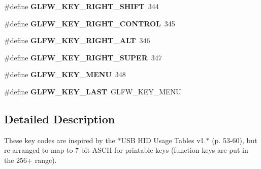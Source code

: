 \begin{DoxyCompactItemize}
\item 
\hypertarget{group__keys_gaffca36b99c9dce1a19cb9befbadce691}{\#define {\bfseries \-G\-L\-F\-W\-\_\-\-K\-E\-Y\-\_\-\-R\-I\-G\-H\-T\-\_\-\-S\-H\-I\-F\-T}~344}\label{group__keys_gaffca36b99c9dce1a19cb9befbadce691}

\item 
\hypertarget{group__keys_gad1ca2094b2694e7251d0ab1fd34f8519}{\#define {\bfseries \-G\-L\-F\-W\-\_\-\-K\-E\-Y\-\_\-\-R\-I\-G\-H\-T\-\_\-\-C\-O\-N\-T\-R\-O\-L}~345}\label{group__keys_gad1ca2094b2694e7251d0ab1fd34f8519}

\item 
\hypertarget{group__keys_ga687b38009131cfdd07a8d05fff8fa446}{\#define {\bfseries \-G\-L\-F\-W\-\_\-\-K\-E\-Y\-\_\-\-R\-I\-G\-H\-T\-\_\-\-A\-L\-T}~346}\label{group__keys_ga687b38009131cfdd07a8d05fff8fa446}

\item 
\hypertarget{group__keys_gad4547a3e8e247594acb60423fe6502db}{\#define {\bfseries \-G\-L\-F\-W\-\_\-\-K\-E\-Y\-\_\-\-R\-I\-G\-H\-T\-\_\-\-S\-U\-P\-E\-R}~347}\label{group__keys_gad4547a3e8e247594acb60423fe6502db}

\item 
\hypertarget{group__keys_ga9845be48a745fc232045c9ec174d8820}{\#define {\bfseries \-G\-L\-F\-W\-\_\-\-K\-E\-Y\-\_\-\-M\-E\-N\-U}~348}\label{group__keys_ga9845be48a745fc232045c9ec174d8820}

\item 
\hypertarget{group__keys_ga442cbaef7bfb9a4ba13594dd7fbf2789}{\#define {\bfseries \-G\-L\-F\-W\-\_\-\-K\-E\-Y\-\_\-\-L\-A\-S\-T}~\-G\-L\-F\-W\-\_\-\-K\-E\-Y\-\_\-\-M\-E\-N\-U}\label{group__keys_ga442cbaef7bfb9a4ba13594dd7fbf2789}

\end{DoxyCompactItemize}


\subsection{\-Detailed \-Description}
\-These key codes are inspired by the $\ast$\-U\-S\-B \-H\-I\-D \-Usage \-Tables v1.$\ast$ (p. 53-\/60), but re-\/arranged to map to 7-\/bit \-A\-S\-C\-I\-I for printable keys (function keys are put in the 256+ range).


